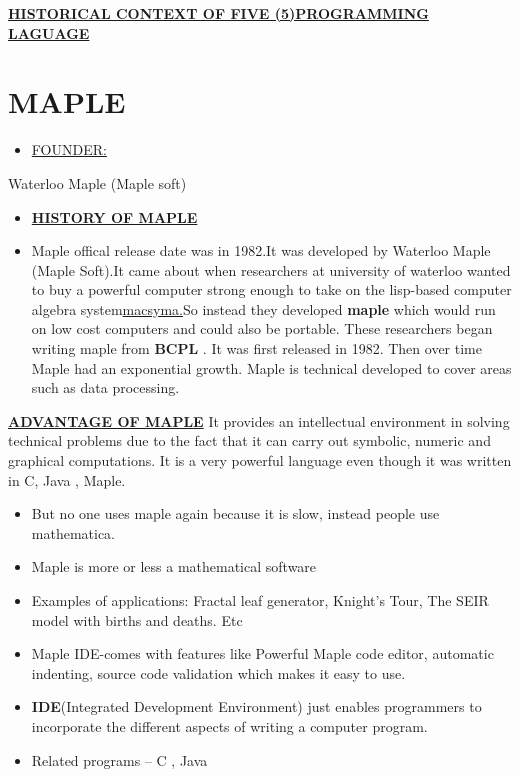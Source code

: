 \documentclass{article}
\begin{document}
	  \textbf{\underline{HISTORICAL CONTEXT OF FIVE (5)PROGRAMMING LAGUAGE}}
	  \section{MAPLE}
	  \begin{itemize}
	  	\item \underline{FOUNDER:}
	  	\end{itemize}
  	Waterloo Maple (Maple soft)
  	\begin{itemize}
  		\item \textbf{\underline{HISTORY OF MAPLE}}
  		
  	\end{itemize}
  \begin{itemize}
  	\item Maple offical release date was in 1982.It was developed by Waterloo Maple (Maple Soft).It came about when researchers at university of waterloo wanted to buy a powerful computer strong enough to take on the lisp-based computer algebra system\underline{macsyma.}So instead they developed \textbf{maple} which would run on low cost computers and  could also be portable. These researchers began writing maple from \textbf{BCPL}  . It was first released in 1982.  Then over time Maple had an exponential growth.  Maple is technical developed to cover areas such as data processing.
  	
  	
  \end{itemize}
\underline{\textbf{ADVANTAGE OF MAPLE}}
 It provides an intellectual environment in solving technical problems due to the fact that it can carry out symbolic, numeric and graphical computations. It is a very powerful language even though it was written in C, Java , Maple.
 \begin{itemize}
 	\item But no one uses maple again because it is slow, instead people use mathematica.
 	\item Maple is more or less a mathematical software
 	\item Examples of applications:
 	Fractal leaf generator, Knight’s Tour, The SEIR model with births and deaths. Etc
 	\item Maple IDE-comes with features like
 	Powerful Maple code editor, automatic indenting, source code validation which makes it easy to use.
 	\item \textbf{IDE}(Integrated Development Environment) just enables programmers to incorporate the different aspects of writing a computer  program.
 	\item Related programs – C , Java
 	
 	
 \end{itemize}
	  	
 
\end{document}
